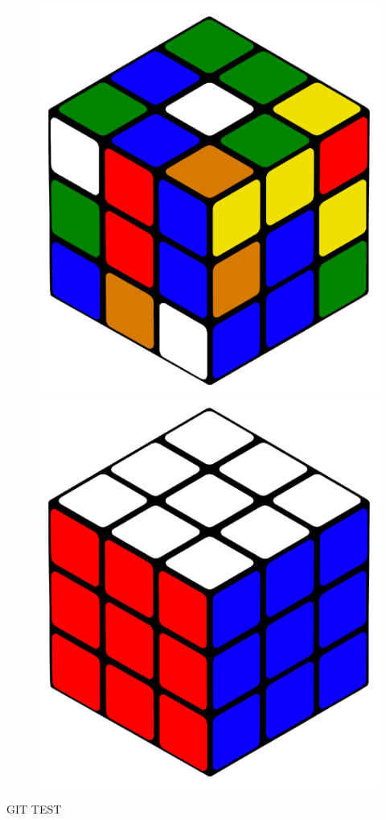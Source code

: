 \documentclass[12pt,a4paper, usenames, dvipsnames]{scrartcl}
\begin{document}
\begin{figure}[h]
\includegraphics[scale=0.09]{3x3scrambled.png}
\includegraphics[scale=0.09]{3x3solved.png}
\end{figure}

GIT TEST
\end{document}
